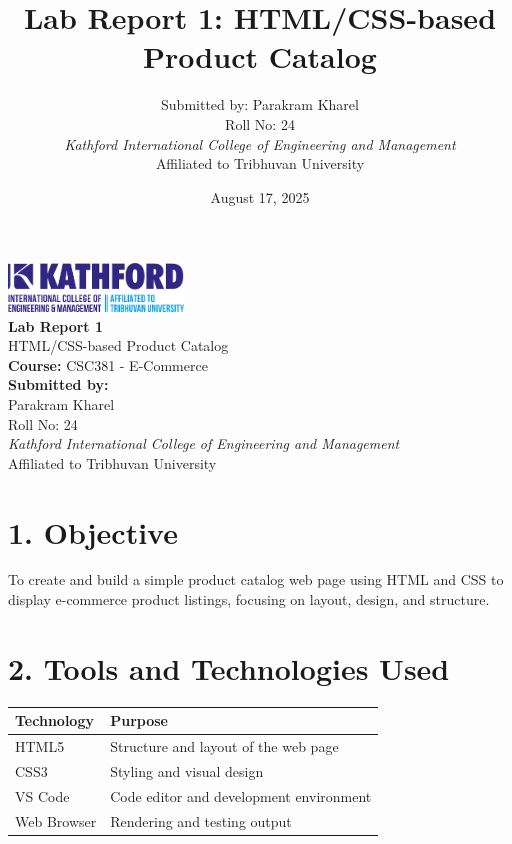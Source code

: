 \documentclass[a4paper,12pt]{article}
\title{Lab Report 1: HTML/CSS-based Product Catalog}
\author{Submitted by: Parakram Kharel \\ Roll No: 24 \\ 
\textit{Kathford International College of Engineering and Management} \\ 
Affiliated to Tribhuvan University}
\begin{document}


\begin{titlepage}
  \begin{center}
    \vspace*{2cm}
    \includegraphics[width=0.35\textwidth]{Kath.png} \\[2cm]

    {\Huge \bfseries Lab Report 1} \\[0.5cm]
    {\Large HTML/CSS-based Product Catalog} \\[2cm]

    {\Large \textbf{Course:} CSC381 - E-Commerce} \\[1cm]
    {\Large \textbf{Submitted by:}} \\[0.3cm]
    {\large Parakram Kharel \\ Roll No: 24} \\[2cm]

    \textit{Kathford International College of Engineering and Management} \\
    Affiliated to Tribhuvan University \\[3cm]
    
    \date{August 17, 2025}
    {\normalsize \@date}
  \end{center}
\end{titlepage}

\pagestyle{main}
\setlength{\parskip}{1em}

\section*{1. Objective}
To create and build a simple product catalog web page using HTML and CSS to display e-commerce product listings, focusing on layout, design, and structure.


\section*{2. Tools and Technologies Used}
\begin{longtable}{ll}
\toprule
\textbf{Technology} & \textbf{Purpose} \\
\midrule
HTML5 & Structure and layout of the web page \\
CSS3 & Styling and visual design \\
VS Code & Code editor and development environment \\
Web Browser & Rendering and testing output \\
\bottomrule
\end{longtable}
\end{document}
